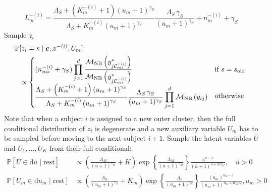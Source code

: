 \documentclass[11pt]{article}
\begin{document}
\begin{algorithm}[h!]
\begin{algorithmic}
	\[
	L^{-(i)}_m = \frac{\Lambda_S + \left(K^{-(i)}_m + 1\right)\left(u_{m} + 1\right)^{\gamma_S}}{\Lambda_S + K^{-(i)}_m\left(u_{m}+ 1\right)^{\gamma_S}} \frac{\Lambda_S \, \gamma_S}{(u_{m}+1)^{\gamma_S}} + n_m^{-(i)} + \gamma_S
	\]
	\State Sample $z_i$ 
	\[
	\begin{aligned}
		\mathbb{P}&[z_i = s \mid \bm{c}, \bm{z}^{-(i)}, U_m ] \\
		&\propto\begin{cases}
			\begin{aligned}
				(n_{ms}^{-(i)} + \gamma_S)
				\prod_{j=1}^d \frac{\mathcal{M}_\mathrm{NB}\left(y^*_{j\mathcal{C}_{ms}^{+(i)}} \right) 
				}{\mathcal{M}_\mathrm{NB}\left(y^*_{j\mathcal{C}_{ms}^{-(i)}} \right)}
			\end{aligned}& \text{if } s = s_\textnormal{old}\\
			\begin{aligned}
				\frac{\Lambda_S + \left(K^{-(i)}_m + 1\right)\left(u_{m} + 1\right)^{\gamma_S}}{\Lambda_S + K^{-(i)}_m\left(u_{m}+ 1\right)^{\gamma_S}} \frac{\Lambda_S \, \gamma_S}{(u_{m}+1)^{\gamma_S}} \prod_{j=1}^d\mathcal{M}_\mathrm{NB}\left(y_{ij}\right)\end{aligned} & \text{otherwise }\\
		\end{cases}
	\end{aligned}
	\]
	\indent Note that when a subject $i$ is assigned to a new outer cluster, then the full conditional distribution of $z_i$ is degenerate and a new auxiliary variable $U_m$ has to be sampled before moving to the next subject $i+1$. 
	\EndFor
	\State Sample the latent variables $\bar{U}$ and $U_1,\ldots,U_K$ from their full conditional:
	\small
	\[
	\begin{aligned}
		\mathbb{P} \left[\bar{U} \in  \text{d}\bar{u}\mid \text{rest}\right] & \propto 
		\left(\frac{\Lambda_M}{\left(\bar{u} + 1\right)^{\gamma_M}} + K\right)
		\exp\left\{\frac{\Lambda_M}{\left(\bar{u} + 1\right)^{\gamma_M}}\right\}
		\frac{\bar{u}^{n-1}}{\left(\bar{u} + 1\right)^{n + K\gamma_M}},\quad \bar{u}>0\\
		\mathbb{P} \left[U_{m} \in  \text{d} u_{m}\mid \text{rest}\right] & 
		\propto 
		\left(\frac{\Lambda_S}{(u_{m} + 1)^{\gamma_S}} + K_m\right)
		\exp\left\{\frac{\Lambda_s}{\left(u_{m} + 1\right)^{\gamma_S}}\right\}
		\frac{\left(u_{m}\right)^{n_m-1}}{\left(u_{m} + 1\right)^{n_m + K_m\gamma_S}}, u_{m}>0
	\end{aligned}
	\]
	\normalsize
\end{algorithmic}
\end{algorithm}
\end{document}
